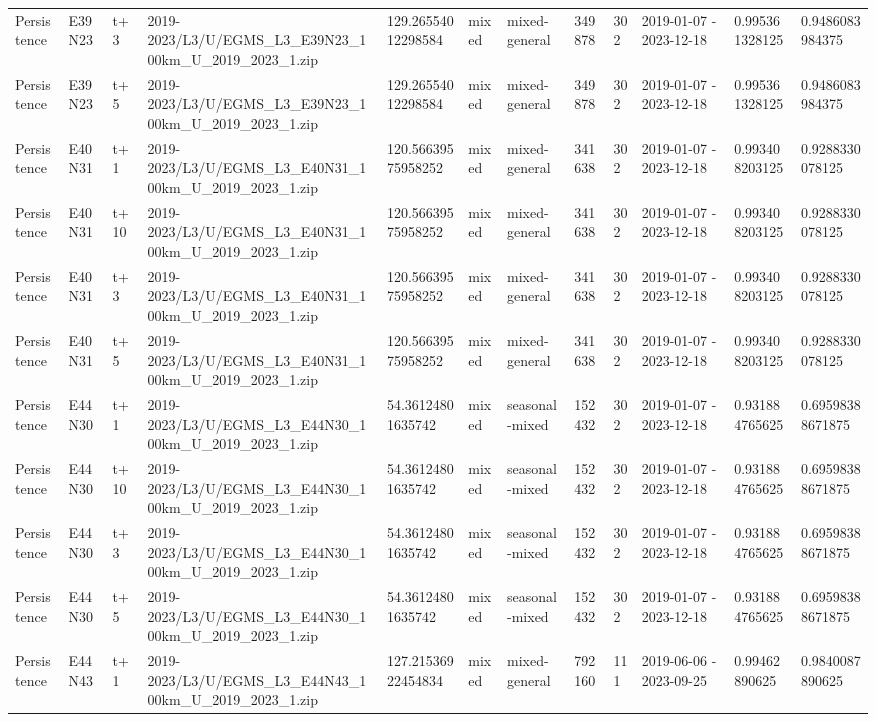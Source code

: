 \begin{landscape}
\begin{longtable}{llllllllllll}
Persistence & E39N23 & t+3 & 2019-2023/L3/U/EGMS\_L3\_E39N23\_100km\_U\_2019\_2023\_1.zip & 129.26554012298584 & mixed & mixed-general & 349878 & 302 & 2019-01-07 - 2023-12-18 & 0.995361328125 & 0.9486083984375 \\
Persistence & E39N23 & t+5 & 2019-2023/L3/U/EGMS\_L3\_E39N23\_100km\_U\_2019\_2023\_1.zip & 129.26554012298584 & mixed & mixed-general & 349878 & 302 & 2019-01-07 - 2023-12-18 & 0.995361328125 & 0.9486083984375 \\
Persistence & E40N31 & t+1 & 2019-2023/L3/U/EGMS\_L3\_E40N31\_100km\_U\_2019\_2023\_1.zip & 120.56639575958252 & mixed & mixed-general & 341638 & 302 & 2019-01-07 - 2023-12-18 & 0.993408203125 & 0.9288330078125 \\
Persistence & E40N31 & t+10 & 2019-2023/L3/U/EGMS\_L3\_E40N31\_100km\_U\_2019\_2023\_1.zip & 120.56639575958252 & mixed & mixed-general & 341638 & 302 & 2019-01-07 - 2023-12-18 & 0.993408203125 & 0.9288330078125 \\
Persistence & E40N31 & t+3 & 2019-2023/L3/U/EGMS\_L3\_E40N31\_100km\_U\_2019\_2023\_1.zip & 120.56639575958252 & mixed & mixed-general & 341638 & 302 & 2019-01-07 - 2023-12-18 & 0.993408203125 & 0.9288330078125 \\
Persistence & E40N31 & t+5 & 2019-2023/L3/U/EGMS\_L3\_E40N31\_100km\_U\_2019\_2023\_1.zip & 120.56639575958252 & mixed & mixed-general & 341638 & 302 & 2019-01-07 - 2023-12-18 & 0.993408203125 & 0.9288330078125 \\
Persistence & E44N30 & t+1 & 2019-2023/L3/U/EGMS\_L3\_E44N30\_100km\_U\_2019\_2023\_1.zip & 54.36124801635742 & mixed & seasonal-mixed & 152432 & 302 & 2019-01-07 - 2023-12-18 & 0.931884765625 & 0.69598388671875 \\
Persistence & E44N30 & t+10 & 2019-2023/L3/U/EGMS\_L3\_E44N30\_100km\_U\_2019\_2023\_1.zip & 54.36124801635742 & mixed & seasonal-mixed & 152432 & 302 & 2019-01-07 - 2023-12-18 & 0.931884765625 & 0.69598388671875 \\
Persistence & E44N30 & t+3 & 2019-2023/L3/U/EGMS\_L3\_E44N30\_100km\_U\_2019\_2023\_1.zip & 54.36124801635742 & mixed & seasonal-mixed & 152432 & 302 & 2019-01-07 - 2023-12-18 & 0.931884765625 & 0.69598388671875 \\
Persistence & E44N30 & t+5 & 2019-2023/L3/U/EGMS\_L3\_E44N30\_100km\_U\_2019\_2023\_1.zip & 54.36124801635742 & mixed & seasonal-mixed & 152432 & 302 & 2019-01-07 - 2023-12-18 & 0.931884765625 & 0.69598388671875 \\
Persistence & E44N43 & t+1 & 2019-2023/L3/U/EGMS\_L3\_E44N43\_100km\_U\_2019\_2023\_1.zip & 127.21536922454834 & mixed & mixed-general & 792160 & 111 & 2019-06-06 - 2023-09-25 & 0.99462890625 & 0.9840087890625 \\

\end{longtable}
\end{landscape}
